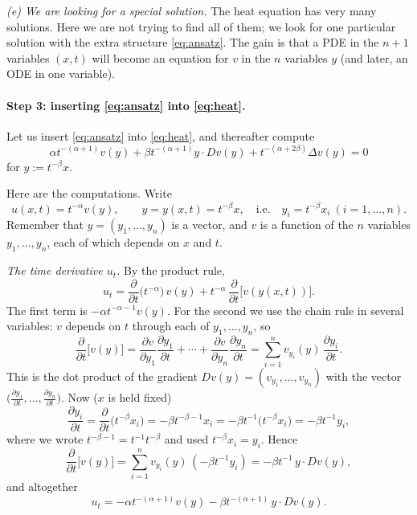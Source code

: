 \documentclass[11pt]{article}
\theoremstyle{plain}
\theoremstyle{definition}
\theoremstyle{remark}
\begin{document}
\emph{(e) We are looking for a special solution.} The heat equation has very many solutions. Here we are not trying to find all of them; we look for one particular solution with the extra structure \eqref{eq:ansatz}. The gain is that a PDE in the $n+1$ variables $(x,t)$ will become an equation for $v$ in the $n$ variables $y$ (and later, an ODE in one variable).

\paragraph{Step 3: inserting \eqref{eq:ansatz} into \eqref{eq:heat}.}
Let us insert \eqref{eq:ansatz} into \eqref{eq:heat}, and thereafter compute
\begin{equation}\label{eq:heat5}
\alpha t^{-(\alpha+1)} v(y) + \beta t^{-(\alpha+1)} y\cdot Dv(y) + t^{-(\alpha+2\beta)}\Delta v(y) = 0
\end{equation}
for $y := t^{-\beta}x$.

Here are the computations. Write
$$ u(x,t) = t^{-\alpha} v(y), \qquad y = y(x,t) = t^{-\beta}x, \quad\text{i.e.}\quad y_i = t^{-\beta}x_i \ (i = 1,\dots,n). $$
Remember that $y = (y_1,\dots,y_n)$ is a vector, and $v$ is a function of the $n$ variables $y_1,\dots,y_n$, each of which depends on $x$ and $t$.

\emph{The time derivative $u_t$.} By the product rule,
$$ u_t = \frac{\partial}{\partial t}\big(t^{-\alpha}\big)\, v(y) + t^{-\alpha}\, \frac{\partial}{\partial t}\big[v(y(x,t))\big]. $$
The first term is $-\alpha t^{-\alpha-1}v(y)$. For the second we use the chain rule in several variables: $v$ depends on $t$ through each of $y_1,\dots,y_n$, so
$$ \frac{\partial}{\partial t}\big[v(y)\big] = \frac{\partial v}{\partial y_1}\frac{\partial y_1}{\partial t} + \cdots + \frac{\partial v}{\partial y_n}\frac{\partial y_n}{\partial t} = \sum_{i=1}^n v_{y_i}(y)\,\frac{\partial y_i}{\partial t}. $$
This is the dot product of the gradient $Dv(y) = (v_{y_1},\dots,v_{y_n})$ with the vector $\big(\frac{\partial y_1}{\partial t},\dots,\frac{\partial y_n}{\partial t}\big)$. Now ($x$ is held fixed)
$$ \frac{\partial y_i}{\partial t} = \frac{\partial}{\partial t}\big(t^{-\beta}x_i\big) = -\beta t^{-\beta-1}x_i = -\beta t^{-1}\big(t^{-\beta}x_i\big) = -\beta t^{-1} y_i, $$
where we wrote $t^{-\beta - 1} = t^{-1}t^{-\beta}$ and used $t^{-\beta}x_i = y_i$. Hence
$$ \frac{\partial}{\partial t}\big[v(y)\big] = \sum_{i=1}^n v_{y_i}(y)\,(-\beta t^{-1}y_i) = -\beta t^{-1}\, y\cdot Dv(y), $$
and altogether
$$ u_t = -\alpha t^{-(\alpha+1)} v(y) - \beta t^{-(\alpha+1)}\, y\cdot Dv(y). $$
\end{document}
